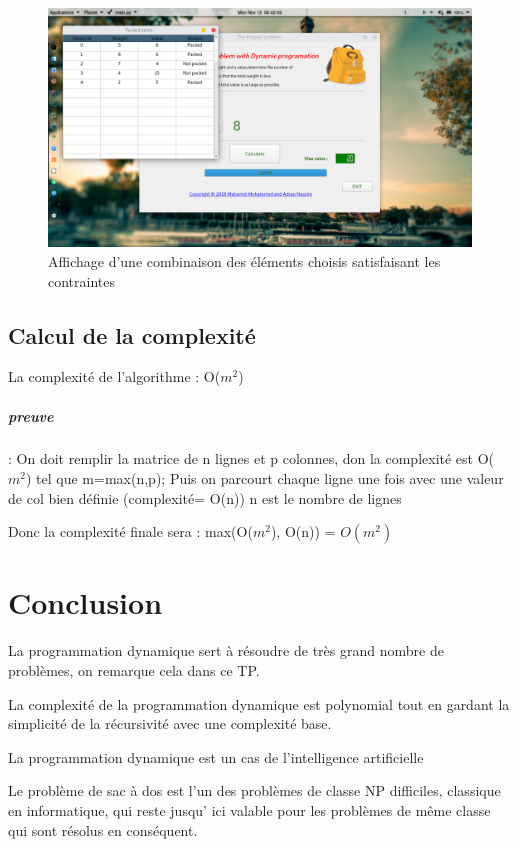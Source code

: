 \documentclass[12pt]{report}
\begin{document}
	\begin{figure}[h!]
	\centering
	\includegraphics[scale=1, width=18cm]{../screenshots/5.png}
	\caption{Affichage d'une combinaison des éléments choisis satisfaisant les contraintes}
	\end{figure}
	\newpage	
	\FloatBarrier
	\section{Calcul de la complexité}
	\par{} 
	
	La complexité de l'algorithme : O($m^{2}$)
	
	\paragraph*{preuve}:
	On doit remplir la matrice de n lignes et p colonnes, don la complexité est O($m^{2}$) tel que m=max(n,p); 	Puis on parcourt chaque ligne une fois avec une valeur de col bien définie (complexité= O(n)) n est le nombre de lignes
	\par{}
	Donc la complexité finale sera : max(O($m^{2}$), O(n)) = $O(m^{2})$
	\chapter{Conclusion}
	\par{} 
	La programmation dynamique sert à résoudre de très grand nombre de problèmes, on remarque cela dans ce TP.
\par{}	
	La complexité de la programmation dynamique est polynomial tout en gardant la simplicité de la récursivité avec une complexité base.
	\par{}
	La programmation dynamique est un cas de l'intelligence artificielle 
	\par{}
	Le problème de sac à dos est l'un des problèmes de classe NP difficiles, classique en informatique, qui reste jusqu' ici valable pour les problèmes de même classe qui sont résolus en conséquent.
\end{document}
